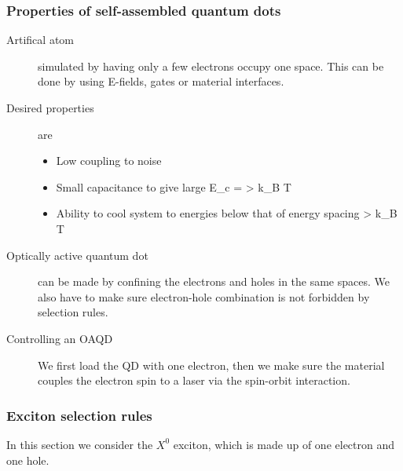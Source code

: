 \subsubsection{Properties of self-assembled quantum dots}
\begin{description}
\item[Artifical atom] simulated by having only a few electrons occupy one space. 
This can be done by using E-fields, gates or material interfaces. 

\item[Desired properties] are
\begin{itemize}
\item Low coupling to noise
\item Small capacitance to give large
\beq
E_c =  > k_B T
\eeq
\item Ability to cool system to energies below that of energy spacing
\beq
\Delta \epsilon > k_B T
\eeq
\end{itemize}

\item[Optically active quantum dot] can be made by confining the electrons and holes in the same spaces. We also have to make sure electron-hole combination is not forbidden by selection rules. 

\item[Controlling an OAQD] We first load the QD with one electron, then we make sure the material couples the electron spin to a laser via the spin-orbit interaction. 

\end{description}
\subsubsection{Exciton selection rules}
In this section we consider the $X^0$ exciton, which is made up of one electron and one hole. 

